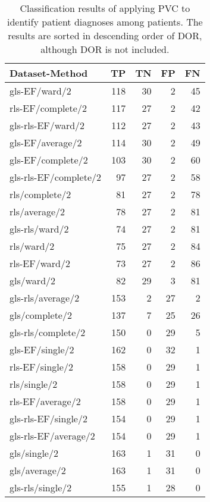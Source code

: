 \begin{longtable}{lrrrr}
    \caption{Classification results of applying PVC to identify patient diagnoses among patients.
             The results are sorted in descending order of DOR, although DOR is not included.}
    \label{tab:pvc_ind_raw_results}\\
    \hline
    Dataset-Method        &     TP &    TN &    FP &    FN \\
    \hline
    gls-EF/ward/2         & 118 & 30 &  2 & 45 \\
    rls-EF/complete/2     & 117 & 27 &  2 & 42 \\
    gls-rls-EF/ward/2     & 112 & 27 &  2 & 43 \\
    gls-EF/average/2      & 114 & 30 &  2 & 49 \\
    gls-EF/complete/2     & 103 & 30 &  2 & 60 \\
    gls-rls-EF/complete/2 &  97 & 27 &  2 & 58 \\
    rls/complete/2        &  81 & 27 &  2 & 78 \\
    rls/average/2         &  78 & 27 &  2 & 81 \\
    gls-rls/ward/2        &  74 & 27 &  2 & 81 \\
    rls/ward/2            &  75 & 27 &  2 & 84 \\
    rls-EF/ward/2         &  73 & 27 &  2 & 86 \\
    gls/ward/2            &  82 & 29 &  3 & 81 \\
    gls-rls/average/2     & 153 &  2 & 27 &  2 \\
    gls/complete/2        & 137 &  7 & 25 & 26 \\
    gls-rls/complete/2    & 150 &  0 & 29 &  5 \\
    gls-EF/single/2       & 162 &  0 & 32 &  1 \\
    rls-EF/single/2       & 158 &  0 & 29 &  1 \\
    rls/single/2          & 158 &  0 & 29 &  1 \\
    rls-EF/average/2      & 158 &  0 & 29 &  1 \\
    gls-rls-EF/single/2   & 154 &  0 & 29 &  1 \\
    gls-rls-EF/average/2  & 154 &  0 & 29 &  1 \\
    gls/single/2          & 163 &  1 & 31 &  0 \\
    gls/average/2         & 163 &  1 & 31 &  0 \\
    gls-rls/single/2      & 155 &  1 & 28 &  0 \\
    \hline
\end{longtable}

